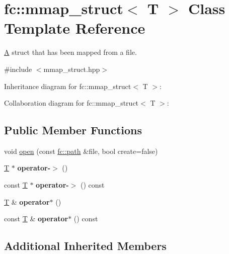 \hypertarget{classfc_1_1mmap__struct}{}\section{fc\+:\+:mmap\+\_\+struct$<$ T $>$ Class Template Reference}
\label{classfc_1_1mmap__struct}


\mbox{\hyperlink{struct_a}{A}} struct that has been mapped from a file.  




{\ttfamily \#include $<$mmap\+\_\+struct.\+hpp$>$}



Inheritance diagram for fc\+:\+:mmap\+\_\+struct$<$ T $>$\+:


Collaboration diagram for fc\+:\+:mmap\+\_\+struct$<$ T $>$\+:
\subsection*{Public Member Functions}
\begin{DoxyCompactItemize}
\item 
void \mbox{\hyperlink{classfc_1_1mmap__struct_acce9015a433bd1366d2eba95c4e53ab2}{open}} (const \mbox{\hyperlink{classfc_1_1path}{fc\+::path}} \&file, bool create=false)
\item 
\mbox{\label{classfc_1_1mmap__struct_a75457a7f45e704ef251d389c5ec998d5}} 
\mbox{\hyperlink{struct_t}{T}} $\ast$ {\bfseries operator-\/$>$} ()
\item 
\mbox{\label{classfc_1_1mmap__struct_ad1e53a03e7d3f0eb0dcbc0a014ad50a7}} 
const \mbox{\hyperlink{struct_t}{T}} $\ast$ {\bfseries operator-\/$>$} () const
\item 
\mbox{\label{classfc_1_1mmap__struct_aa6e46e6ed1549e1edb0949af6ae35d10}} 
\mbox{\hyperlink{struct_t}{T}} \& {\bfseries operator$\ast$} ()
\item 
\mbox{\label{classfc_1_1mmap__struct_a4e41543e20650f72f33d75698b8622a8}} 
const \mbox{\hyperlink{struct_t}{T}} \& {\bfseries operator$\ast$} () const
\end{DoxyCompactItemize}
\subsection*{Additional Inherited Members}


